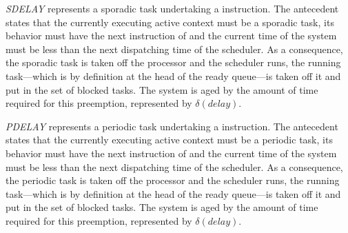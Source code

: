 \emph{SDELAY} represents a sporadic task undertaking a  instruction. The antecedent states that the currently
executing active context must be a sporadic task, its behavior must
have the next instruction of  and the current time of
the system must be less than the next dispatching time of the
scheduler. As a consequence, the sporadic task is taken off the
processor and the scheduler runs, the running task---which is by
definition at the head of the ready queue---is taken off it and put in
the set of blocked tasks. The system is aged by the amount of time
required for this preemption, represented by $\delta(delay)$.


\emph{PDELAY} represents a periodic task undertaking a  instruction. The antecedent states that the currently
executing active context must be a periodic task, its behavior must
have the next instruction of  and the current time of
the system must be less than the next dispatching time of the
scheduler. As a consequence, the periodic task is taken off the
processor and the scheduler runs, the running task---which is by
definition at the head of the ready queue---is taken off it and put in
the set of blocked tasks. The system is aged by the amount of time
required for this preemption, represented by $\delta(delay)$.


